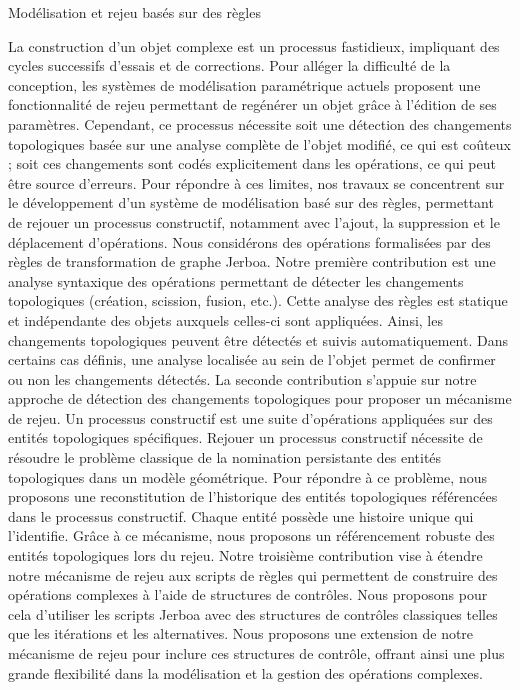 \begin{resume}{Modélisation et rejeu basés sur des règles}
	\justifying

	La construction d'un objet complexe est un processus fastidieux, impliquant
	des cycles successifs d'essais et de corrections. Pour alléger la difficulté
	de la conception, les systèmes de modélisation paramétrique actuels
	proposent une fonctionnalité de rejeu permettant de regénérer un objet grâce
	à l'édition de ses paramètres. Cependant, ce processus nécessite soit une
	détection des changements topologiques basée sur une analyse complète de
	l'objet modifié, ce qui est coûteux ; soit ces changements sont codés
	explicitement dans les opérations, ce qui peut être source d'erreurs. Pour
	répondre à ces limites, nos travaux se concentrent sur le développement d'un
	système de modélisation basé sur des règles, permettant de rejouer un
	processus constructif, notamment avec l'ajout, la suppression et le
	déplacement d'opérations. Nous considérons des opérations formalisées par
	des règles de transformation de graphe Jerboa. Notre première contribution
	est une analyse syntaxique des opérations permettant de détecter les
	changements topologiques (création, scission, fusion, etc.). Cette analyse
	des règles est statique et indépendante des objets auxquels celles-ci sont
	appliquées. Ainsi, les changements topologiques peuvent être détectés et
	suivis automatiquement. Dans certains cas définis, une analyse localisée au
	sein de l'objet permet de confirmer ou non les changements détectés. La
	seconde contribution s'appuie sur notre approche de détection des
	changements topologiques pour proposer un mécanisme de rejeu. Un processus
	constructif est une suite d'opérations appliquées sur des entités
	topologiques spécifiques. Rejouer un processus constructif nécessite de
	résoudre le problème classique de la nomination persistante des entités
	topologiques dans un modèle géométrique. Pour répondre à ce problème, nous
	proposons une reconstitution de l'historique des entités topologiques
	référencées dans le processus constructif. Chaque entité possède une
	histoire unique qui l'identifie. Grâce à ce mécanisme, nous proposons un
	référencement robuste des entités topologiques lors du rejeu. Notre
	troisième contribution vise à étendre notre mécanisme de rejeu aux scripts
	de règles qui permettent de construire des opérations complexes à l'aide de
	structures de contrôles. Nous proposons pour cela d'utiliser les scripts
	Jerboa avec des structures de contrôles classiques telles que les itérations
	et les alternatives. Nous proposons une extension de notre mécanisme de
	rejeu pour inclure ces structures de contrôle, offrant ainsi une plus grande
	flexibilité dans la modélisation et la gestion des opérations complexes.
\end{resume}
\footnotesize{}

